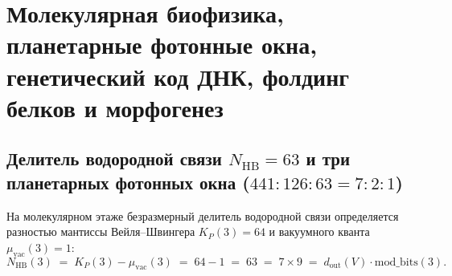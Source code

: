 \chapter{Молекулярная биофизика, планетарные фотонные окна, генетический код ДНК, фолдинг белков и морфогенез}
\label{ch:mono-biology}

\section{Делитель водородной связи \texorpdfstring{$N_{\mathrm{HB}} = 63$}{N\_HB = 63} и три планетарных фотонных окна (\texorpdfstring{$441 : 126 : 63 = 7 : 2 : 1$}{441 : 126 : 63 = 7 : 2 : 1})}

На молекулярном этаже безразмерный делитель водородной связи определяется разностью мантиссы Вейля--Швингера $K_P(3) = 64$ и вакуумного кванта $\mu_{\mathrm{vac}}(3) = 1$:
\begin{equation}
  \label{eq:mono-nhb-63}
  N_{\mathrm{HB}}(3) \;=\; K_P(3) - \mu_{\mathrm{vac}}(3) \;=\; 64 - 1 \;=\; 63 \;=\; 7 \times 9 \;=\; d_{\mathrm{out}}(V)\cdot \mathrm{mod\_bits}(3).
\end{equation}

